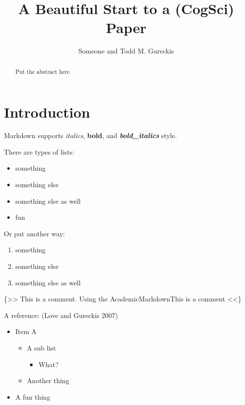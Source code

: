 \documentclass[
]{article}
\title{A Beautiful Start to a (CogSci) Paper}
\author{Someone and Todd M. Gureckis}
\date{}
\providecommand{\tightlist}{%
  \setlength{\itemsep}{0pt}\setlength{\parskip}{0pt}}
\begin{document}
\maketitle
\begin{abstract}
Put the abstract here
\end{abstract}

\hypertarget{introduction}{%
\section{Introduction}\label{introduction}}

Markdown supports \emph{italics}, \textbf{bold}, and
\textbf{\emph{bold\_italics}} style.

There are types of lists:

\begin{itemize}
\tightlist
\item
  something\\
\item
  something else\\
\item
  something else as well\\
\item
  fun
\end{itemize}

Or put another way:

\begin{enumerate}
\def\labelenumi{\arabic{enumi}.}
\tightlist
\item
  something\\
\item
  something else\\
\item
  something else as well
\end{enumerate}

\{\textgreater{}\textgreater{} This is a comment. Using the
AcademicMarkdownThis is a comment \textless{}\textless{}\}

A reference: (Love and Gureckis 2007)

\begin{itemize}
\tightlist
\item
  Item A

  \begin{itemize}
  \tightlist
  \item
    A sub list

    \begin{itemize}
    \tightlist
    \item
      What?
    \end{itemize}
  \item
    Another thing
  \end{itemize}
\item
  A fun thing
\end{itemize}
\end{document}
